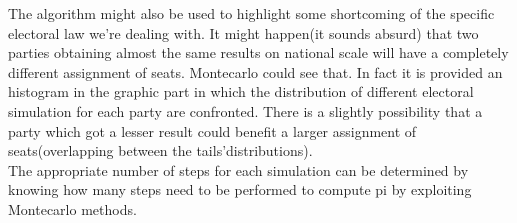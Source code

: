 \documentclass[12pt,a4paper,openright]{report}
\begin{document}
The algorithm might also be used to highlight some shortcoming of the specific electoral law we're dealing with. It might happen(it sounds absurd) that two parties obtaining almost the same results on national scale will have a completely different assignment of seats. Montecarlo could see that. In fact it is provided an histogram in the graphic part in which the distribution of different electoral simulation for each party are confronted. There is a slightly possibility that a party which got a lesser result could benefit a larger assignment of seats(overlapping between the tails'distributions).\\
The appropriate number of steps for each simulation can be determined by knowing how many steps need to be performed to compute pi by exploiting Montecarlo methods.\\
\end{document}
